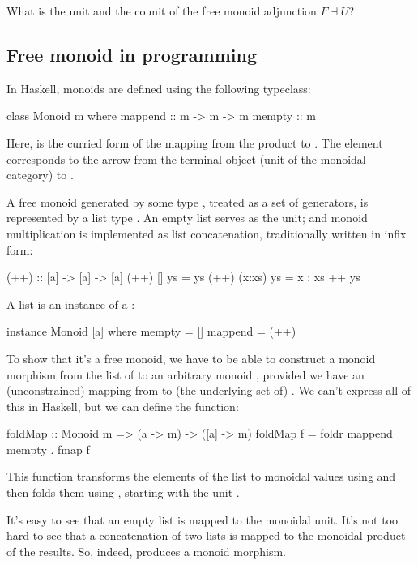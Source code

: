 \documentclass[DaoFP]{subfiles}
\begin{document}
\begin{exercise}
What is the unit and the counit of the free monoid adjunction $F \dashv U$?
\end{exercise}

\subsection{Free monoid in programming}

In Haskell, monoids are defined using the following typeclass:
\begin{haskell}
class Monoid m where
  mappend :: m -> m -> m
  mempty  :: m
\end{haskell}
Here,  is the curried form of the mapping from the product  to . The  element corresponds to the arrow from the terminal object (unit of the monoidal category) to . 

A free monoid generated by some type , treated as a set of generators, is represented by a list type \hask{[a]}. An empty list serves as the unit; and monoid multiplication is implemented as list concatenation, traditionally written in infix form:
\begin{haskell}
(++) :: [a] -> [a] -> [a]
(++) []     ys = ys
(++) (x:xs) ys = x : xs ++ ys
\end{haskell}
A list is an instance of a :
\begin{haskell}
instance Monoid [a] where
  mempty = []
  mappend = (++)
\end{haskell}

To show that it's a free monoid, we have to be able to construct a monoid morphism from the list of  to an arbitrary monoid , provided we have an (unconstrained) mapping from  to (the underlying set of) . We can't express all of this in Haskell, but we can define the function:
\begin{haskell}
foldMap :: Monoid m => (a -> m) -> ([a] -> m)
foldMap f = foldr mappend mempty . fmap f
\end{haskell}
This function transforms the elements of the list to monoidal values using  and then folds them using , starting with the unit . 

It's easy to see that an empty list is mapped to the monoidal unit. It's not too hard to see that a concatenation of two lists is mapped to the monoidal product of the results. So, indeed,  produces a monoid morphism. 
\end{document}
